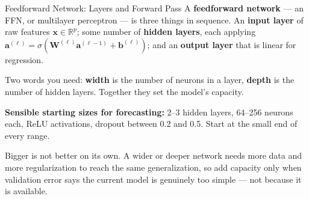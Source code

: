 \documentclass[aspectratio=169, 11pt]{beamer}
\begin{document}
\begin{frame}{Feedforward Network: Layers and Forward Pass}
  A \textbf{feedforward network} --- an FFN, or multilayer perceptron --- is three things
  in sequence. An \textbf{input layer} of raw features $\mathbf{x} \in \mathbb{R}^p$; some number
  of \textbf{hidden layers}, each applying
  $\mathbf{a}^{(\ell)} = \sigma\!\left(\mathbf{W}^{(\ell)}\mathbf{a}^{(\ell-1)} + \mathbf{b}^{(\ell)}\right)$;
  and an \textbf{output layer} that is linear for regression.

  \vspace{0.15cm}
  Two words you need: \textbf{width} is the number of neurons in a layer, \textbf{depth} is the
  number of hidden layers. Together they set the model's capacity.

  \begin{keybox}
    \textbf{Sensible starting sizes for forecasting:} 2--3 hidden layers, 64--256 neurons each,
    ReLU activations, dropout between 0.2 and 0.5. Start at the small end of every range.
  \end{keybox}

  \vspace{0.1cm}
  Bigger is not better on its own. A wider or deeper network needs more data and more
  regularization to reach the same generalization, so add capacity only when validation error
  says the current model is genuinely too simple --- not because it is available.
\end{frame}
\end{document}

